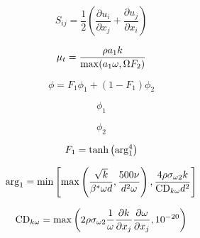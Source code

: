 {\newpage\clearpage
{}%
\begin{displaymath}
S_{ij} = \frac{1}{2} \left( \frac{\partial u_i}{\partial x_j} + \frac{\partial u_j}{\partial x_i} \right)
\end{displaymath}%
\lthtmldisplayZ
\lthtmlcheckvsize\clearpage}

{\newpage\clearpage
{}%
\begin{displaymath}
\mu_t = \frac{\rho a_1 k}{{\rm max} (a_1 \omega, \Omega F_2)}
\end{displaymath}%
\lthtmldisplayZ
\lthtmlcheckvsize\clearpage}

{\newpage\clearpage
{}%
\begin{displaymath}
\phi = F_1 \phi_1 + (1-F_1) \phi_2
\end{displaymath}%
\lthtmldisplayZ
\lthtmlcheckvsize\clearpage}

{\newpage\clearpage
{}%
\begin{displaymath}
\phi_1
\end{displaymath}%
\lthtmldisplayZ
\lthtmlcheckvsize\clearpage}

{\newpage\clearpage
{}%
\begin{displaymath}
\phi_2
\end{displaymath}%
\lthtmldisplayZ
\lthtmlcheckvsize\clearpage}

{\newpage\clearpage
{}%
\begin{displaymath}
F_1 = {\rm tanh} \left({\rm arg}_1^4 \right)
\end{displaymath}%
\lthtmldisplayZ
\lthtmlcheckvsize\clearpage}

{\newpage\clearpage
{}%
\begin{displaymath}
{\rm arg}_1 = {\rm min} \left[ {\rm max} \left( \frac{\sqrt{k}}{\beta^*\omega d},
   \frac{500 \nu}{d^2 \omega} \right) , \frac{4 \rho \sigma_{\omega 2} k}{{\rm CD}_{k \omega} d^2} \right]
\end{displaymath}%
\lthtmldisplayZ
\lthtmlcheckvsize\clearpage}

{\newpage\clearpage
{}%
\begin{displaymath}
{\rm CD}_{k \omega} = {\rm max} \left(2 \rho \sigma_{\omega 2} \frac{1}{\omega}
   \frac{\partial k}{\partial x_j} \frac{\partial \omega}{\partial x_j}, 10^{-20} \right)
\end{displaymath}%
\lthtmldisplayZ
\lthtmlcheckvsize\clearpage}

